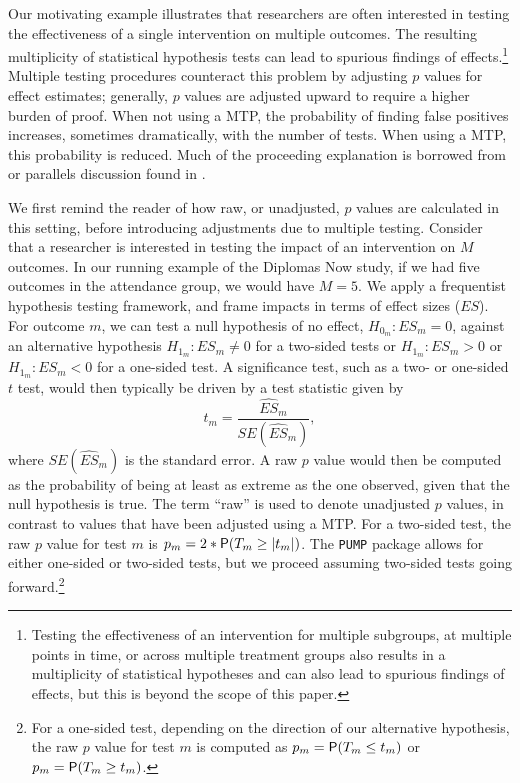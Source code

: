 \documentclass[
]{jss}
\begin{document}
Our motivating example illustrates that researchers are often interested
in testing the effectiveness of a single intervention on multiple
outcomes. The resulting multiplicity of statistical hypothesis tests can
lead to spurious findings of effects.\footnote{Testing the effectiveness
  of an intervention for multiple subgroups, at multiple points in time,
  or across multiple treatment groups also results in a multiplicity of
  statistical hypotheses and can also lead to spurious findings of
  effects, but this is beyond the scope of this paper.} Multiple testing
procedures counteract this problem by adjusting \(p\) values for effect
estimates; generally, \(p\) values are adjusted upward to require a
higher burden of proof. When not using a MTP, the probability of finding
false positives increases, sometimes dramatically, with the number of
tests. When using a MTP, this probability is reduced. Much of the
proceeding explanation is borrowed from or parallels discussion found in
\citet{Porter2018}.

We first remind the reader of how raw, or unadjusted, \(p\) values are
calculated in this setting, before introducing adjustments due to
multiple testing. Consider that a researcher is interested in testing
the impact of an intervention on \(M\) outcomes. In our running example
of the Diplomas Now study, if we had five outcomes in the attendance
group, we would have \(M = 5\). We apply a frequentist hypothesis
testing framework, and frame impacts in terms of effect sizes (\(ES\)).
For outcome \(m\), we can test a null hypothesis of no effect,
\(H_{0_m}: ES_m = 0\), against an alternative hypothesis
\(H_{1_m}: ES_m \neq 0\) for a two-sided tests or \(H_{1_m}: ES_m > 0\)
or \(H_{1_m}: ES_m < 0\) for a one-sided test. A significance test, such
as a two- or one-sided \(t\) test, would then typically be driven by a
test statistic given by \begin{equation}
t_m = \frac{\widehat{ES}_m}{SE(\hat{ES}_m)},
\end{equation} where \(SE(\hat{ES}_m)\) is the standard error. A raw
\(p\) value would then be computed as the probability of being at least
as extreme as the one observed, given that the null hypothesis is true.
The term ``raw'' is used to denote unadjusted \(p\) values, in contrast
to values that have been adjusted using a MTP. For a two-sided test, the
raw \(p\) value for test \(m\) is \(p_m=2*\mathsf{P}(T_m \geq |t_m|)\). The
\texttt{PUMP} package allows for either one-sided or two-sided tests,
but we proceed assuming two-sided tests going forward.\footnote{For a
  one-sided test, depending on the direction of our alternative
  hypothesis, the raw \(p\) value for test \(m\) is computed as
  \(p_m=\mathsf{P}(T_m \leq t_m)\) or \(p_m=\mathsf{P}(T_m \geq t_m)\).}
\end{document}

